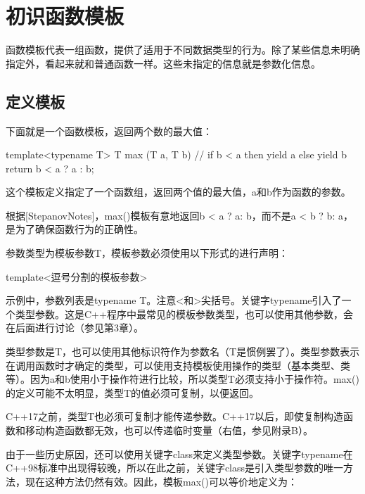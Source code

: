 \section{初识函数模板}

函数模板代表一组函数，提供了适用于不同数据类型的行为。除了某些信息未明确指定外，看起来就和普通函数一样。这些未指定的信息就是参数化信息。

\subsection{定义模板}

下面就是一个函数模板，返回两个数的最大值：

\begin{cpp}
template<typename T>
T max (T a, T b)
{
	// if b < a then yield a else yield b
	return b < a ? a : b;
}
\end{cpp}

这个模板定义指定了一个函数组，返回两个值的最大值，a和b作为函数的参数。

\begin{notice}
根据[StepanovNotes]，max()模板有意地返回b < a ? a: b，而不是a < b ? b: a，是为了确保函数行为的正确性。
\end{notice}

参数类型为模板参数T，模板参数必须使用以下形式的进行声明：

\begin{cpp}
template<逗号分割的模板参数>
\end{cpp}

示例中，参数列表是typename T。注意<和>尖括号。关键字typename引入了一个类型参数。这是C++程序中最常见的模板参数类型，也可以使用其他参数，会在后面进行讨论（参见第3章）。

类型参数是T，也可以使用其他标识符作为参数名（T是惯例罢了）。类型参数表示在调用函数时才确定的类型，可以使用支持模板使用操作的类型（基本类型、类等）。因为a和b使用小于操作符进行比较，所以类型T必须支持小于操作符。max()的定义可能不太明显，类型T的值必须可复制，以便返回。

\begin{notice}
C++17之前，类型T也必须可复制才能传递参数。C++17以后，即使复制构造函数和移动构造函数都无效，也可以传递临时变量（右值，参见附录B）。
\end{notice}

由于一些历史原因，还可以使用关键字class来定义类型参数。关键字typename在C++98标准中出现得较晚，所以在此之前，关键字class是引入类型参数的唯一方法，现在这种方法仍然有效。因此，模板max()可以等价地定义为：

